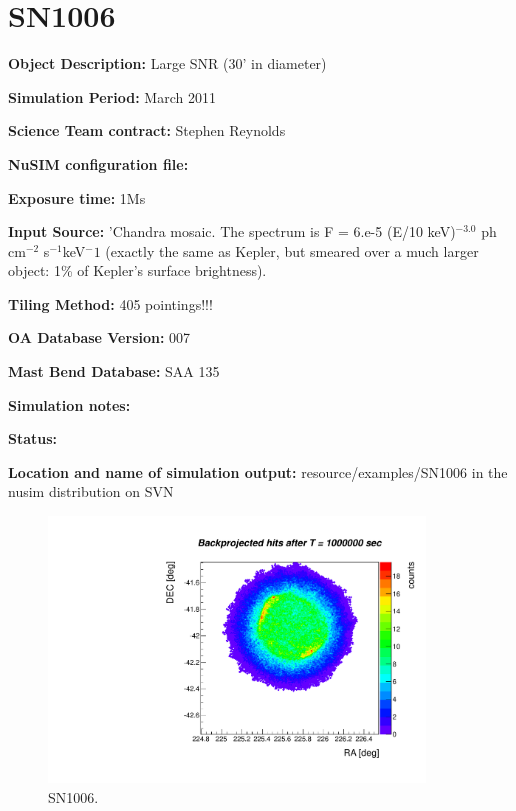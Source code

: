 
\newpage

\section{SN1006}

\textbf{Object Description:} Large SNR (30' in diameter)

\textbf{Simulation Period:}  March 2011

\textbf{Science Team contract:} Stephen Reynolds

\textbf{NuSIM configuration file:}

\textbf{Exposure time:} 1Ms

\textbf{Input Source:} 'Chandra mosaic.  The spectrum 
is F = 6.e-5 (E/10 keV)$^{-3.0}$ ph cm$^{-2}$ s$^{-1}$keV${^-1}$ (exactly the same as Kepler, but smeared over a much larger
object: 1\% of Kepler's surface brightness).

\textbf{Tiling Method:} 405 pointings!!!

\textbf{OA Database Version:} 007

\textbf{Mast Bend Database:} SAA 135

\textbf{Simulation notes:} 

\textbf{Status:} 

\textbf{Location and name of simulation output:} resource/examples/SN1006 in the nusim distribution on SVN

\begin{figure}[h]
\begin{center}
\includegraphics[width=10cm]{SN1006/SN1006.pdf}  %
\caption{SN1006.}
\label{sn1006} 
\end{center}
\end{figure}

